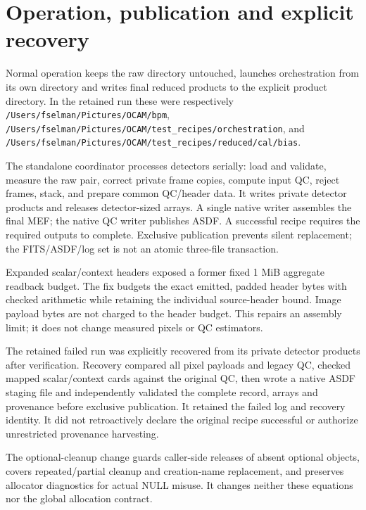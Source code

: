 \documentclass[11pt,a4paper]{article}
\newcommand{\code}[1]{\nolinkurl{#1}}
\begin{document}
\newpage
\section{Operation, publication and explicit recovery}
Normal operation keeps the raw directory untouched, launches orchestration
from its own directory and writes final reduced products to the explicit
product directory. In the retained run these were respectively
\code{/Users/fselman/Pictures/OCAM/bpm},
\code{/Users/fselman/Pictures/OCAM/test_recipes/orchestration}, and
\code{/Users/fselman/Pictures/OCAM/test_recipes/reduced/cal/bias}.

The standalone coordinator processes detectors serially: load and validate,
measure the raw pair, correct private frame copies, compute input QC, reject
frames, stack, and prepare common QC/header data. It writes private detector
products and releases detector-sized arrays. A single native writer assembles
the final MEF; the native QC writer publishes ASDF. A successful recipe requires
the required outputs to complete. Exclusive publication prevents silent
replacement; the FITS/ASDF/log set is not an atomic three-file transaction.

Expanded scalar/context headers exposed a former fixed 1 MiB aggregate
readback budget. The fix budgets the exact emitted, padded header bytes with
checked arithmetic while retaining the individual source-header bound.
Image payload bytes are not charged to the header budget. This repairs an
assembly limit; it does not change measured pixels or QC estimators.

The retained failed run was explicitly recovered from its private detector
products after verification. Recovery compared all pixel payloads and legacy
QC, checked mapped scalar/context cards against the original QC, then wrote a
native ASDF staging file and independently validated the complete record,
arrays and provenance before exclusive publication. It retained the failed
log and recovery identity. It did not retroactively declare the original
recipe successful or authorize unrestricted provenance harvesting.

The optional-cleanup change guards caller-side releases of absent optional
objects, covers repeated/partial cleanup and creation-name replacement, and
preserves allocator diagnostics for actual NULL misuse. It changes neither
these equations nor the global allocation contract.

\newpage
\end{document}
